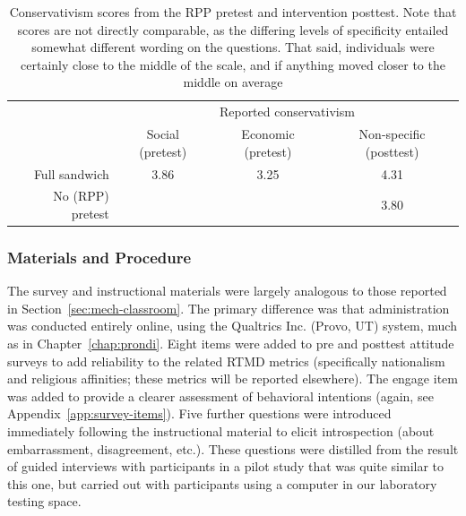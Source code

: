 \begin{table}
    \caption{Conservativism scores from the RPP pretest and intervention
        posttest. Note that scores are not directly comparable, as the
        differing levels of specificity entailed somewhat different wording on
        the questions. That said, individuals were certainly close to the middle
        of the scale, and if anything moved closer to the middle on average}
    \label{table:mech-rpp-cons}
\centering
\begin{tabular}{rccc}
  \toprule
   & \multicolumn{3}{c}{Reported conservativism} \\
   & Social (pretest) & Economic (pretest) & Non-specific (posttest) \\
  \midrule
  Full sandwich & 3.86 & 3.25 & 4.31 \\
  No (RPP) pretest & & & 3.80 \\
  \bottomrule
\end{tabular}
\end{table}

\subsubsection{Materials and Procedure}

The survey and instructional materials were largely analogous to those reported
in Section~\ref{sec:mech-classroom}.  The primary difference was that
administration was conducted entirely online, using the Qualtrics Inc. (Provo,
UT) system, much as in Chapter~\ref{chap:prondi}. Eight items were added to pre
and posttest attitude surveys to add reliability to the related RTMD metrics
(specifically nationalism and religious affinities; these metrics will be
reported elsewhere). The \textsf{engage} item was added to provide a clearer
assessment of behavioral intentions (again, see
Appendix~\ref{app:survey-items}). Five further questions were introduced
immediately following the instructional material to elicit introspection (about
embarrassment, disagreement, etc.). These questions were distilled from the
result of guided interviews with participants in a pilot study that was quite
similar to this one, but carried out with participants using a computer in our
laboratory testing space.

